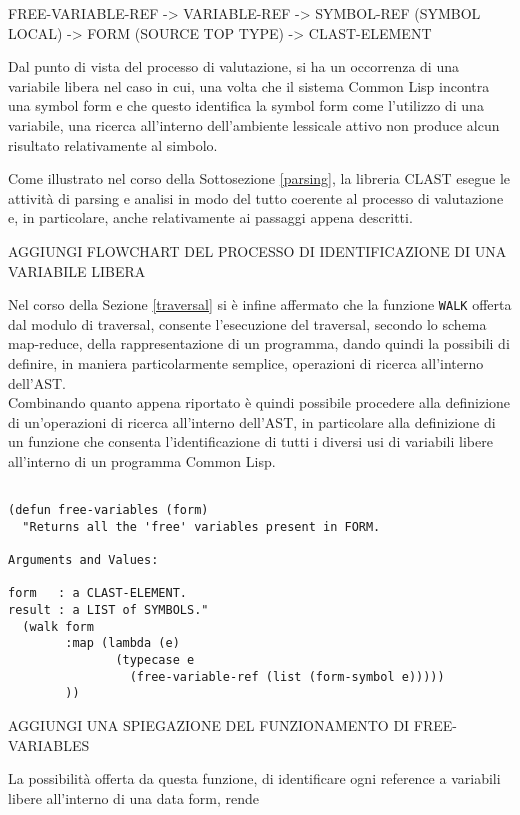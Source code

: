 FREE-VARIABLE-REF -> VARIABLE-REF -> SYMBOL-REF (SYMBOL LOCAL) -> FORM (SOURCE TOP TYPE) -> CLAST-ELEMENT

Dal punto di vista del processo di valutazione, si ha un occorrenza di una
variabile libera nel caso in cui, una volta che il sistema Common Lisp incontra
una symbol form e che questo identifica la symbol form come l'utilizzo di una
variabile, una ricerca all'interno dell'ambiente lessicale attivo non produce
alcun risultato relativamente al simbolo.

Come illustrato nel corso della Sottosezione \ref{parsing}, la libreria CLAST
esegue le attività di parsing e analisi in modo del tutto coerente al processo
di valutazione e, in particolare, anche relativamente ai passaggi appena
descritti.

AGGIUNGI FLOWCHART DEL PROCESSO DI IDENTIFICAZIONE DI UNA VARIABILE LIBERA

Nel corso della Sezione \ref{traversal} si è infine affermato che la funzione
\texttt{WALK} offerta dal modulo di traversal, consente l'esecuzione del
traversal, secondo lo schema map-reduce, della rappresentazione di un programma,
dando quindi la possibili di definire, in maniera particolarmente semplice,
operazioni di ricerca all'interno dell'AST.\\

Combinando quanto appena riportato è quindi possibile procedere alla definizione
di un'operazioni di ricerca all'interno dell'AST, in particolare alla
definizione di un funzione che consenta l'identificazione di tutti i diversi usi
di variabili libere all'interno di un programma Common Lisp.

\begin{lstlisting}[caption=Query functions per l'identificazione di variabili
libere all'interno di una form Common Lisp]

(defun free-variables (form)
  "Returns all the 'free' variables present in FORM.

Arguments and Values:

form   : a CLAST-ELEMENT.
result : a LIST of SYMBOLS."
  (walk form
        :map (lambda (e)
               (typecase e
                 (free-variable-ref (list (form-symbol e)))))
        ))

\end{lstlisting}

AGGIUNGI UNA SPIEGAZIONE DEL FUNZIONAMENTO DI FREE-VARIABLES

La possibilità offerta da questa funzione, di identificare ogni reference a
variabili libere all'interno di una data form, rende

